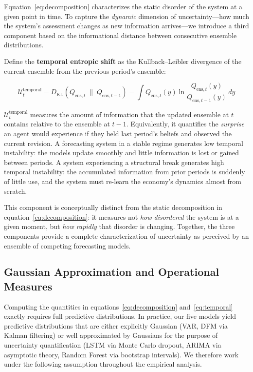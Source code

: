 \documentclass[12pt,a4paper]{article}
\theoremstyle{remark}
\begin{document}
Equation~\eqref{eq:decomposition} characterizes the static disorder of the
system at a given point in time. To capture the \emph{dynamic} dimension
of uncertainty—how much the system's assessment changes as new information
arrives—we introduce a third component based on the informational distance
between consecutive ensemble distributions.

Define the \textbf{temporal entropic shift} as the Kullback--Leibler
divergence of the current ensemble from the previous period's ensemble:

\begin{equation}
    \mathcal{U}^{\text{temporal}}_t =
    D_{\text{KL}}(Q_{\text{ens},t} \;\|\; Q_{\text{ens},t-1})
    = \int Q_{\text{ens},t}(y)
    \ln \frac{Q_{\text{ens},t}(y)}{Q_{\text{ens},t-1}(y)}\, dy
    \label{eq:temporal}
\end{equation}

$\mathcal{U}^{\text{temporal}}_t$ measures the amount of information that
the updated ensemble at $t$ contains relative to the ensemble at $t-1$.
Equivalently, it quantifies the \emph{surprise} an agent would experience
if they held last period's beliefs and observed the current revision. A
forecasting system in a stable regime generates low temporal instability:
the models update smoothly and little information is lost or gained between
periods. A system experiencing a structural break generates high temporal
instability: the accumulated information from prior periods is suddenly of
little use, and the system must re-learn the economy's dynamics almost from
scratch.

This component is conceptually distinct from the static decomposition in
equation~\eqref{eq:decomposition}: it measures not \emph{how disordered}
the system is at a given moment, but \emph{how rapidly} that disorder is
changing. Together, the three components provide a complete characterization
of uncertainty as perceived by an ensemble of competing forecasting models.

\subsection{Gaussian Approximation and Operational Measures}
\label{sec:gaussian_approx}

Computing the quantities in equations~\eqref{eq:decomposition}
and~\eqref{eq:temporal} exactly requires full predictive distributions.
In practice, our five models yield predictive distributions that are
either explicitly Gaussian (VAR, DFM via Kalman filtering) or well
approximated by Gaussians for the purpose of uncertainty quantification
(LSTM via Monte Carlo dropout, ARIMA via asymptotic theory, Random
Forest via bootstrap intervals). We therefore work under the following
assumption throughout the empirical analysis.
\end{document}
